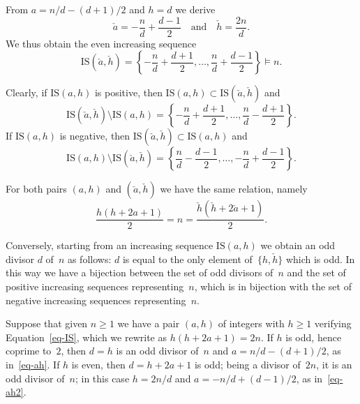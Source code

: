 \documentclass[11pt, a4paper]{amsart}
\theoremstyle{definition}
\newcommand\IS{\mathrm{IS}}
\numberwithin{equation}{section}
\begin{document}
From $a = n/d - (d+1)/2$ and $h = d$ we derive 
\begin{equation}\label{eq-ah2}
\check{a} = -\frac{n}{d} + \frac{d-1}{2}
\quad\text{and}\quad
\check{h} = \frac{2n}{d}.
\end{equation}
We thus obtain the even increasing sequence
\begin{equation}\label{def-ISdv}
\IS(\check{a},\check{h}) 
= \left\{ -\frac{n}{d} + \frac{d+1}{2}, \ldots, \frac{n}{d} + \frac{d-1}{2} \right\} \models n .
\end{equation}

Clearly, if $\IS(a,h)$ is positive, then $\IS(a,h) \subset \IS(\check{a},\check{h})$ and
\begin{equation}\label{def-ISdv1}
\IS(\check{a},\check{h}) \setminus \IS(a,h)
= \left\{ -\frac{n}{d} + \frac{d+1}{2}, \ldots, \frac{n}{d} - \frac{d+1}{2} \right\}  .
\end{equation}
If $\IS(a,h)$ is negative, then $\IS(\check{a},\check{h}) \subset \IS(a,h)$ and
\begin{equation}\label{def-ISdv2}
 \IS(a,h) \setminus \IS(\check{a},\check{h})
= \left\{ \frac{n}{d} - \frac{d-1}{2}, \ldots, -\frac{n}{d} + \frac{d-1}{2} \right\}  .
\end{equation}

For both pairs $(a,h)$ and $(\check{a}, \check{h})$ we have the same relation, namely
\begin{equation}\label{eq-IS}
\frac{h(h+2a+1)}{2} = n
= \frac{\check{h}(\check{h}+2\check{a}+1)}{2}  .
\end{equation}

Conversely, starting from an increasing sequence $\IS(a,h)$ we obtain an odd divisor $d$ of~$n$ as follows: 
$d$ is equal to the only element of~$\{h, \check{h}\}$ which is odd.
In this way we have a bijection between the set of odd divisors of~$n$ and 
the set of positive increasing sequences representing~$n$,
which is in bijection with the set of negative increasing sequences representing~$n$.

Suppose that given $n\geq 1$ we have a pair $(a,h)$ of integers with $h\geq 1$ verifying Equation~\eqref{eq-IS},
which we rewrite as $h(h+2a+1) = 2n$.
If $h$ is odd, hence coprime to~$2$, then $d = h$ is an odd divisor of~$n$ and $a = n/d - (d+1)/2$, as in~\eqref{eq-ah}.
If $h$ is even, then $d = h+2a+1$ is odd; being a divisor of~$2n$, it is an odd divisor of~$n$; in this case
$h = 2n/d$ and $a = - n/d + (d-1)/2$, as in~\eqref{eq-ah2}.
\end{document}

